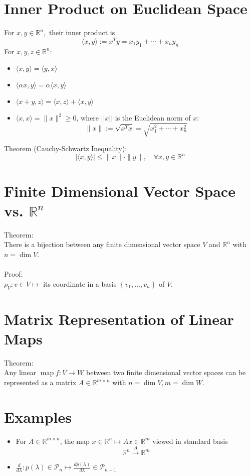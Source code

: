 \documentclass[10pt,a4paper,oneside]{article}
\begin{document}
\section{Inner Product on Euclidean Space}
For $x, y \in \mathbb{R}^{n},$ their inner product is
\[
\langle x, y\rangle := x^{T} y=x_{1} y_{1}+\cdots+x_{n} y_{n}
\]
For $x, y, z \in \mathbb{R}^{n}$:
\begin{itemize}
\item $\langle x, y\rangle=\langle y, x\rangle$
\item $\langle\alpha x, y\rangle=\alpha\langle x, y\rangle$
\item $\langle x+y, z\rangle=\langle x, z\rangle+\langle x, y\rangle$
\item $\langle x, x\rangle=\|x\|^{2} \geq 0$, where $||x||$ is the Euclidean norm of $x$:
\[
\|x\| :=\sqrt{x^{T} x}=\sqrt{x_{1}^{2}+\cdots+x_{n}^{2}}
\]
\end{itemize}
Theorem (Cauchy-Schwartz Inequality):
\[
|\langle x, y\rangle| \leq\|x\| \cdot\|y\|, \quad \forall x, y \in \mathbb{R}^{n}
\]
\section{Finite Dimensional Vector Space vs. $\mathbb{R}^n$}
Theorem:\\
There is a bijection between any finite dimensional vector space $V$ and $\mathbb{R}^n$ with $n=\dim V$.\\
\\
Proof:\\
$\rho_{V} : v \in V \mapsto$ its coordinate in a basis $\left\{v_{1}, \ldots, v_{n}\right\}$ of $V$.
\section{Matrix Representation of Linear Maps}
Theorem:\\
Any linear $\operatorname{map} f : V \rightarrow W$ between two finite dimensional vector spaces can be represented as a matrix $A\in\mathbb{R}^{m\times n}$ with $n=\dim V, m=\dim W$.
\section{Examples}
\begin{itemize}
\item For $A\in\mathbb{R}^{m\times n}$, the map $x \in \mathbb{R}^{n} \mapsto A x \in \mathbb{R}^{m}$ viewed in standard basis
\[
\mathbb{R}^{n} \stackrel{A}{\longrightarrow} \mathbb{R}^{m}
\]
\item $\frac{d}{d \lambda} : p(\lambda) \in \mathcal{P}_{n} \mapsto \frac{d p(\lambda)}{d \lambda} \in \mathcal{P}_{n-1}$
\end{itemize}
\end{document}
